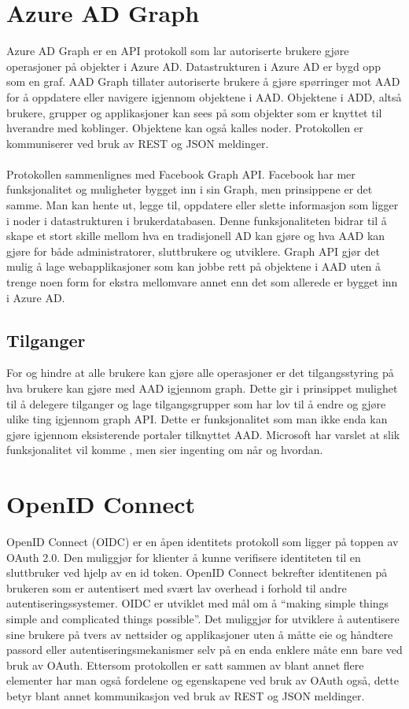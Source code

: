 \section{Azure AD Graph}
\label{sec:teoridel_azureAd_graph}
Azure AD Graph er en API protokoll som lar autoriserte brukere gjøre operasjoner på objekter i Azure AD. Datastrukturen i Azure AD er bygd opp som en graf. AAD Graph tillater autoriserte brukere å gjøre spørringer mot AAD for å oppdatere eller navigere igjennom objektene i AAD. Objektene i ADD, altså brukere, grupper og applikasjoner kan sees på som objekter som er knyttet til hverandre med koblinger. Objektene kan også kalles noder.  Protokollen er kommuniserer ved bruk av REST og JSON meldinger. \\
\\
Protokollen sammenlignes med Facebook Graph API. Facebook har mer funksjonalitet og muligheter bygget inn i sin Graph, men prinsippene er det samme. Man kan hente ut, legge til, oppdatere eller slette informasjon som ligger i noder i datastrukturen i brukerdatabasen. Denne funksjonaliteten bidrar til å skape et stort skille mellom hva en tradisjonell AD kan gjøre og hva AAD kan gjøre for både administratorer, sluttbrukere og utviklere. Graph API gjør det mulig å lage webapplikasjoner som kan jobbe rett på objektene i AAD uten å trenge noen form for ekstra mellomvare annet enn det som allerede er bygget inn i Azure AD.

\subsection*{Tilganger}
For og hindre at alle brukere kan gjøre alle operasjoner er det tilgangsstyring på hva brukere kan gjøre med AAD igjennom graph. Dette gir i prinsippet mulighet til å delegere tilganger og lage tilgangsgrupper som har lov til å endre og gjøre ulike ting igjennom graph API. Dette er funksjonalitet som man ikke enda kan gjøre igjennom eksisterende portaler tilknyttet AAD. Microsoft har varslet at slik funksjonalitet vil komme \cite{NasosAzureADExplained}, men sier ingenting om når og hvordan. 


\section{OpenID Connect}
\label{sec:teoridel_openIdConnect}
OpenID Connect (OIDC) er en åpen identitets protokoll som ligger på toppen av OAuth 2.0. Den muliggjør for klienter å kunne verifisere identiteten til en sluttbruker ved hjelp av en id token. OpenID Connect bekrefter identitenen på brukeren som er autentisert med svært lav overhead i forhold til andre autentiseringssystemer\cite{OIDCFunksjonalitet}. OIDC er utviklet med mål om å “making simple things simple and complicated things possible”\cite{OIDCHjemmeside}. Det muliggjør for utviklere å autentisere sine brukere på tvers av nettsider og applikasjoner uten å måtte eie og håndtere passord eller autentiseringsmekanismer selv på en enda enklere måte enn bare ved bruk av OAuth. Ettersom protokollen er satt sammen av blant annet flere elementer har man også fordelene og egenskapene ved bruk av OAuth også, dette betyr blant annet kommunikasjon ved bruk av REST og JSON meldinger. 

